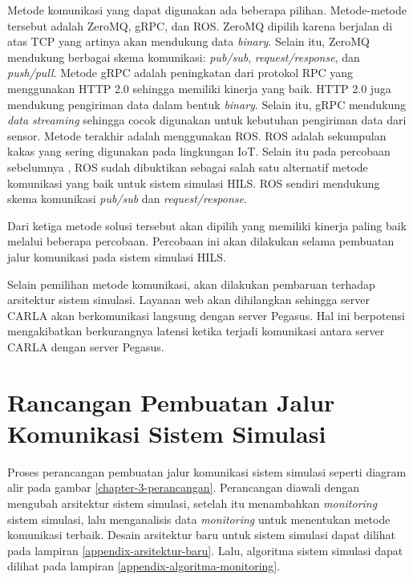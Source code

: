 Metode komunikasi yang dapat digunakan ada beberapa pilihan. Metode-metode
tersebut adalah ZeroMQ, gRPC, dan ROS. ZeroMQ dipilih karena berjalan di atas
TCP yang artinya akan mendukung data \textit{binary}. Selain itu, ZeroMQ
mendukung berbagai skema komunikasi: \textit{pub/sub},
\textit{request/response}, dan \textit{push/pull}. Metode gRPC adalah
peningkatan dari protokol RPC yang menggunakan HTTP 2.0 sehingga memiliki
kinerja yang baik. HTTP 2.0 juga mendukung pengiriman data dalam bentuk
\textit{binary}.  Selain itu, gRPC mendukung \textit{data streaming} sehingga
cocok digunakan untuk kebutuhan pengiriman data dari sensor. Metode terakhir
adalah menggunakan ROS. ROS adalah sekumpulan kakas yang sering digunakan pada
lingkungan IoT. Selain itu pada percobaan sebelumnya
\parencite{brogle_CarlaHILS}, ROS sudah dibuktikan sebagai salah satu alternatif
metode komunikasi yang baik untuk sistem simulasi HILS. ROS sendiri mendukung
skema komunikasi \textit{pub/sub} dan \textit{request/response}.

Dari ketiga metode solusi tersebut akan dipilih yang memiliki kinerja paling
baik melalui beberapa percobaan. Percobaan ini akan dilakukan selama pembuatan
jalur komunikasi pada sistem simulasi HILS.

Selain pemilihan metode komunikasi, akan dilakukan pembaruan terhadap arsitektur
sistem simulasi. Layanan web akan dihilangkan sehingga server CARLA akan
berkomunikasi langsung dengan server Pegasus. Hal ini berpotensi mengakibatkan
berkurangnya latensi ketika terjadi komunikasi antara server CARLA dengan server
Pegasus.

\section{Rancangan Pembuatan Jalur Komunikasi Sistem Simulasi}

Proses perancangan pembuatan jalur komunikasi sistem simulasi seperti diagram
alir pada gambar \ref{chapter-3-perancangan}. Perancangan diawali dengan
mengubah arsitektur sistem simulasi, setelah itu menambahkan \textit{monitoring}
sistem simulasi, lalu menganalisis data \textit{monitoring} untuk menentukan
metode komunikasi terbaik. Desain arsitektur baru untuk sistem simulasi dapat
dilihat pada lampiran \ref{appendix-arsitektur-baru}. Lalu, algoritma sistem
simulasi dapat dilihat pada lampiran \ref{appendix-algoritma-monitoring}.

